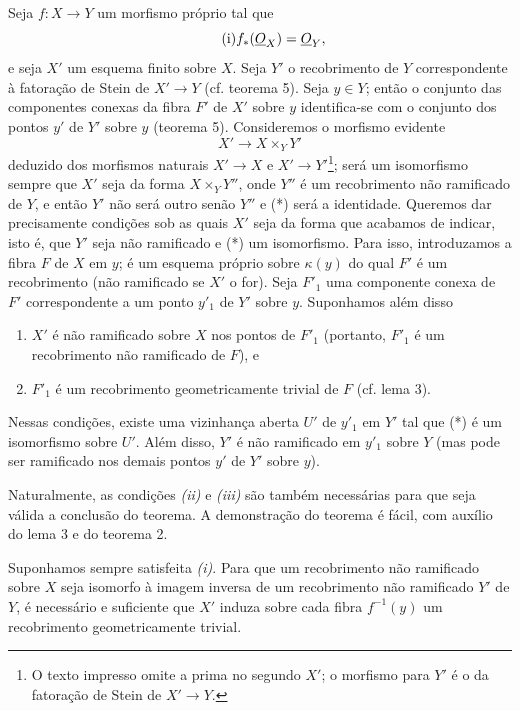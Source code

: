 Seja $f:X\longrightarrow Y$ um morfismo próprio tal que
\begin{equation}
  \tag{i}
  f_*(\underline{O}_X)=\underline{O}_Y,
\end{equation}
e seja $X'$ um esquema finito sobre $X$. Seja $Y'$ o recobrimento de $Y$
correspondente à fatoração de Stein de $X'\longrightarrow Y$
(cf. teorema 5). Seja $y\in Y$; então o conjunto das componentes conexas
da fibra $F'$ de $X'$ sobre $y$ identifica-se com o conjunto dos pontos
$y'$ de $Y'$ sobre $y$ (teorema 5). Consideremos o morfismo evidente
\begin{equation}
  \tag{*}
  X'\longrightarrow X\times_Y Y'
\end{equation}
deduzido dos morfismos naturais $X'\longrightarrow X$ e
$X'\longrightarrow Y'$\footnote{O texto impresso omite a prima no segundo
$X'$; o morfismo para $Y'$ é o da fatoração de Stein de
$X'\to Y$.}; será um isomorfismo sempre que $X'$ seja da forma
$X\times_Y Y''$, onde $Y''$ é um recobrimento não ramificado de $Y$, e
então $Y'$ não será outro senão $Y''$ e (*) será a identidade. Queremos dar
precisamente condições sob as quais $X'$ seja da forma que acabamos de
indicar, isto é, que $Y'$ seja não ramificado e (*) um isomorfismo. Para isso,
introduzamos a fibra $F$ de $X$ em $y$; é um esquema próprio sobre
$\kappa(y)$ do qual $F'$ é um recobrimento (não ramificado se $X'$ o for).
Seja $F'_1$ uma componente conexa de $F'$ correspondente a um ponto $y'_1$ de
$Y'$ sobre $y$. Suponhamos além disso
\begin{enumerate}
  \item[\textit{(ii)}] $X'$ é não ramificado sobre $X$ nos pontos de $F'_1$
    (portanto, $F'_1$ é um recobrimento não ramificado de $F$), e
  \item[\textit{(iii)}] $F'_1$ é um recobrimento geometricamente trivial de
    $F$ (cf. lema 3).
\end{enumerate}

 Nessas condições, existe uma vizinhança aberta $U'$ de
$y'_1$ em $Y'$ tal que (*) é um isomorfismo sobre $U'$. Além disso, $Y'$ é não
ramificado em $y'_1$ sobre $Y$ (mas pode ser ramificado nos demais pontos
$y'$ de $Y'$ sobre $y$).

Naturalmente, as condições \textit{(ii)} e \textit{(iii)} são também
necessárias para que seja válida a conclusão do teorema. A demonstração do
teorema é fácil, com auxílio do lema 3 e do teorema 2.

 Suponhamos sempre satisfeita \textit{(i)}. Para que um
recobrimento não ramificado sobre $X$ seja isomorfo à imagem inversa de um
recobrimento não ramificado $Y'$ de $Y$, é necessário e suficiente que $X'$
induza sobre cada fibra $f^{-1}(y)$ um recobrimento geometricamente trivial.

